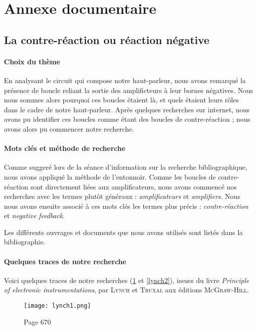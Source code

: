 

\section{Annexe documentaire}

\subsection{La contre-réaction ou réaction négative}

\paragraph{Choix du thème}
En analysant le circuit qui compose notre haut-parleur, nous avons remarqué
la présence de boucle reliant la sortie des amplificteurs à leur bornes négatives.
Nous nous sommes alors pourquoi ces boucles étaient là, et quels étaient leurs rôles
dans le cadre de notre haut-parleur. Après quelques recherches sur internet, nous avons
pu identifier ces boucles comme étant des boucles de contre-réaction ; nous avons
alors pu commencer notre recherche.

\paragraph{Mots clés et méthode de recherche}
Comme suggeré lors de la séance d'information sur la recherche bibliographique,
nous avons appliqué la méthode de l'entonnoir. Comme les boucles de contre-réaction 
sont directement liées aux amplificateurs, nous avons commencé nos recherches avec 
les termes plutôt généraux : \textit{amplificateurs} et \textit{amplifiers}. Nous 
nous avons ensuite associé à ces mots clés les termes plus précis : \textit{contre-réaction}
et \textit{negative feedback}.

Les différents ouvrages et documents que nous avons utilisés sont listés dans la bibliographie.

\paragraph{Quelques traces de notre recherche}
Voici quelques traces de notre recherches (\ref{lynch1} et \ref{lynch2}), issues du livre 
\textit{Principle of electronic instrumentations},
par \textsc{Lynch} et \textsc{Truxal} aux éditions \textsc{McGraw-Hill}.

\begin{figure}[!htb]
	\centering
	\texttt{[image: lynch1.png]}
	\caption{Page 670}
	\label{lynch1}
\end{figure}

